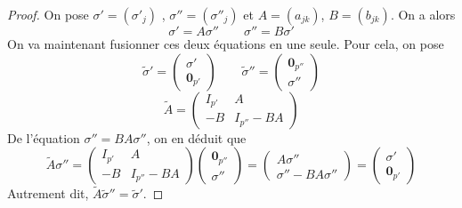 \documentclass{article}
\theoremstyle{definition}
\theoremstyle{remark}
\begin{document}
\begin{proof}
On pose $\sigma' = (\sigma'_j)$ , $\sigma'' = (\sigma''_j)$ et $A=(a_{jk})$, $B=(b_{jk})$. On a alors
\begin{equation*}
\sigma' = A\sigma'' \qquad
\sigma'' = B\sigma'
\end{equation*}
On va maintenant fusionner ces deux équations en une seule. Pour cela, on pose
\begin{equation*}
\tilde{\sigma}' = \begin{pmatrix}
   \sigma' \\
   \mathbf{0}_{p'}
\end{pmatrix} \qquad
\tilde{\sigma}'' = \begin{pmatrix}
   \mathbf{0}_{p''} \\
   \sigma''
\end{pmatrix}
\end{equation*}
$$ \tilde{A} = \begin{pmatrix}
   I_{p'} & A \\
   -B & I_{p''} - BA 
\end{pmatrix}$$
De l'équation $\sigma'' = BA\sigma''$, on en déduit que
\begin{equation*}
\tilde{A}\sigma'' = \begin{pmatrix}
   I_{p'} & A \\
   -B & I_{p''} - BA 
\end{pmatrix} \begin{pmatrix}
   \mathbf{0}_{p''} \\
   \sigma''
\end{pmatrix} = \begin{pmatrix}
   A\sigma'' \\
   \sigma'' - BA\sigma''
\end{pmatrix} = \begin{pmatrix}
   \sigma' \\
   \mathbf{0}_{p'}
\end{pmatrix}
\end{equation*}
Autrement dit, $\tilde{A}\tilde{\sigma}'' = \tilde{\sigma}'$.


\end{proof}
\end{document}
